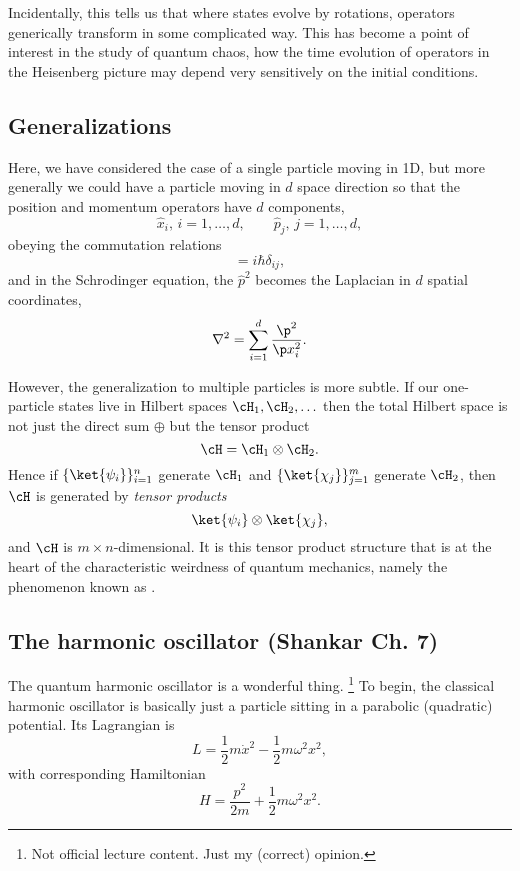 Incidentally, this tells us that where states evolve by rotations, operators generically transform in some complicated way. This has become a point of interest in the study of quantum chaos, how the time evolution of operators in the Heisenberg picture may depend very sensitively on the initial conditions.

\subsection*{Generalizations}
Here, we have considered the case of a single particle moving in 1D, but more generally we could have a particle moving in $d$ space direction so that the position and momentum operators have $d$ components,
\begin{equation}
    \hat x_i, \, i = 1,\ldots ,d,\qquad \hat p_j,\, j=1,\ldots,d,
\end{equation}
obeying the commutation relations
\begin{equation}
    [\hat x_i, \hat p_j]=i\hbar \delta_{ij},
\end{equation}
and in the Schrodinger equation, the $\hat p^2$ becomes the Laplacian in $d$ spatial coordinates,
\begin{equation}
    \nabla^2 = \sum_{i=1}^d \frac{\p^2}{\p x_i^2}.
\end{equation}

However, the generalization to multiple particles is more subtle. If our one-particle states live in Hilbert spaces $\cH_1,\cH_2,\ldots$ then the total Hilbert space is not just the direct sum $\oplus$ but the tensor product
\begin{equation}
    \cH=\cH_1 \otimes \cH_2.
\end{equation}
Hence if $\set{\ket{\psi_i}}_{i=1}^n$ generate $\cH_1$ and $\set{\ket{\chi_j}}_{j=1}^m$ generate $\cH_2$, then $\cH$ is generated by \emph{tensor products}
\begin{equation}
    \ket{\psi_i} \otimes \ket{\chi_j},
\end{equation}
and $\cH$ is $m\times n$-dimensional. It is this tensor product structure that is at the heart of the characteristic weirdness of quantum mechanics, namely the phenomenon known as .

\subsection*{The harmonic oscillator (Shankar Ch. 7)}
The quantum harmonic oscillator is a wonderful thing.%
    \footnote{Not official lecture content. Just my (correct) opinion.}
To begin, the classical harmonic oscillator is basically just a particle sitting in a parabolic (quadratic) potential. Its Lagrangian is
\begin{equation}
    L=\frac{1}{2}m\dot x^2 -\frac{1}{2} m\omega^2 x^2,
\end{equation}
with corresponding Hamiltonian
\begin{equation}
    H=\frac{p^2}{2m} +\frac{1}{2} m\omega^2 x^2.
\end{equation}

